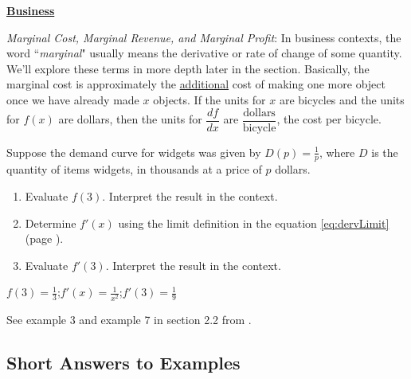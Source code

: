 \noindent\textbf{\underline{Business}}
\begin{justify}
\emph{Marginal Cost, Marginal Revenue, and Marginal Profit}: In business contexts, the word ``\emph{marginal}" usually means the derivative or rate of change of some quantity. We'll explore these terms in more depth later in the section. Basically, the marginal cost is approximately the \underline{additional} cost of making one more object once we have already made $x$ objects. If the units for $x$ are bicycles and the units for $f(x)$ are dollars, then the units for $\dfrac{df}{dx}$ are $\dfrac{\text{dollars}}{\text{bicycle}}$, the cost per bicycle.
\end{justify}
\newpage
\begin{example}
Suppose the demand curve for widgets was given by \(D(p)=\frac{1}{p}\), where $D$ is the quantity of items widgets, in thousands at a price of $p$ dollars. 
\begin{enumerate}[leftmargin=*]
    \item Evaluate \(f(3)\). Interpret the result in the context.
    \item Determine \(f'(x)\) using the limit definition in the equation \ref{eq:dervLimit} (page \pageref{eq:dervLimit}). 
    \item Evaluate \(f'(3)\). Interpret the result in the context.
    
\end{enumerate}

    \begin{sol}
    \(f(3)=\frac{1}{3}\);\(f'(x)=\frac{1}{x^2}\);\(f'(3)=\frac{1}{9}\)
    \end{sol}
    \begin{solL}
    See example 3 and example 7 in section 2.2 from \cite{Calaway}.
    \end{solL}
\end{example}


\vspace*{\fill}
\subsection*{Short Answers to Examples}
\vspace{-0.5cm}
\begin{multicols}{2}

\end{multicols}


